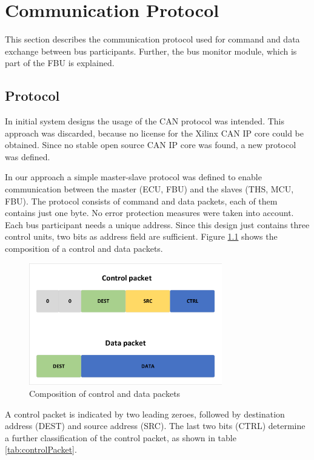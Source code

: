 \chapter{Communication Protocol}

This section describes the communication protocol used for command and data exchange between bus participants. Further, the bus monitor module, which is part of the \gls{FBU} is explained.

\section{Protocol}
\label{sec:protocol}

In initial system designs the usage of the CAN protocol was intended. This approach was discarded, because no license for the Xilinx CAN IP core could be obtained. Since no stable open source CAN IP core was found, a new protocol was defined.

In our approach a simple master-slave protocol was defined to enable communication between the master (\gls{ECU}, \gls{FBU}) and the slaves (\gls{THS}, \gls{MCU}, \gls{FBU}).
The protocol consists of command and data packets, each of them contains just one byte.
No error protection measures were taken into account.
Each bus participant needs a unique address. Since this design just contains three control units, two bits as address field are sufficient. Figure \ref{fig:Protocol} shows the composition of a control and data packets.

\begin{figure}[h!]
    \centering
    \includegraphics[width=0.75\textwidth]{figures/Protocol.pdf}
    \caption{Composition of control and data packets}\label{fig:Protocol}
\end{figure}

A control packet is indicated by two leading zeroes, followed by destination address (DEST) and source address (SRC). The last two bits (CTRL) determine a further classification of the control packet, as shown in table \ref{tab:controlPacket}.

